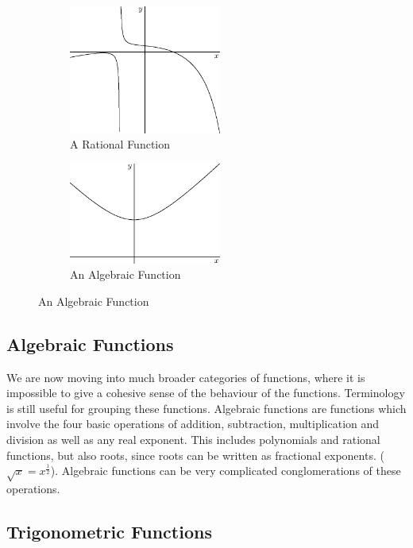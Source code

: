 \documentclass[fleqn]{report}
\begin{document}
\begin{figure}[b]
\centering
\begin{subfigure}{.5\textwidth}
 \centering
 \includegraphics[width=5cm]{figure29.eps}
 \caption{A Rational Function}
\end{subfigure}%
\begin{subfigure}{.5\textwidth}
 \centering
 \includegraphics[width=5cm]{figure30.eps}
 \caption{An Algebraic Function}
\end{subfigure}
\label{Types of Functions 3}
\end{figure}

\subsection*{Algebraic Functions} 

We are now moving into much broader categories of functions,
where it is impossible to give a cohesive sense of the
behaviour of the functions. Terminology is still useful for
grouping these functions. Algebraic functions are
functions which involve the four basic operations of addition,
subtraction, multiplication and division as well as any real
exponent. This includes polynomials and rational functions,
but also roots, since roots can be written as fractional
exponents. ($\sqrt{x} = x^{\frac{1}{2}}$). Algebraic
functions can be very complicated conglomerations of these
operations. 

\subsection*{Trigonometric Functions}
\end{document}
